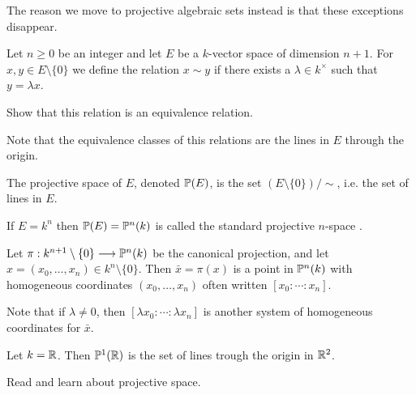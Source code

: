 The reason we move to projective algebraic sets instead is that these exceptions disappear. 


\begin{definition}
Let $n\geq 0$ be an integer and let $E$ be a $k$-vector space of dimension $n+1$. For $x, y\in E\setminus\{0\}$ we define the relation $x\sim y$ if there exists a $\lambda \in k^\times$ such that $y=\lambda x$. 
\end{definition}

\begin{problem}
Show that this relation is an equivalence relation.
\end{problem}

Note that the equivalence classes of this relations are the lines in $E$ through the origin. 

\begin{definition}
The projective space of $E$, denoted $\P(E)$, is the set $(E\setminus \{0\})/\sim$, i.e. the set of lines in $E$. 
\end{definition}

If $E=k^n$ then $\P(E)=\P^n(k)$ is called the standard projective $n$-space .

Let $\pi:k^{n+1}\setminus \{0\}\longrightarrow \P^n(k)$ be the canonical projection, and let $x=(x_0, \ldots, x_n)\in k^n\setminus\{0\}$. Then $\bar{x}=\pi(x)$ is a point in $\P^n(k)$ with homogeneous coordinates $(x_0, \ldots, x_n)$ often written $[x_0:\cdots :x_n]$. 

Note that if $\lambda\neq 0$, then $[\lambda x_0:\cdots :\lambda x_n]$ is another system of homogeneous coordinates for $\bar{x}$. 

\begin{example}
Let $k=\R$. Then $\P^1(\R)$ is the set of lines trough the origin in $\R^2$. 
\end{example}

\begin{problem}
Read and learn about projective space. 
\end{problem}
\label{lec5:visualization}


